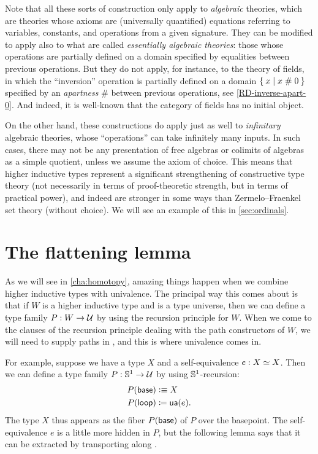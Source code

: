 \mentalpause

Note that all these sorts of construction only apply to \emph{algebraic} theories, which are theories whose axioms are (universally quantified) equations referring to variables, constants, and operations from a given signature.
They can be modified to apply also to what are called \emph{essentially algebraic theories}: those whose operations are partially defined on a domain specified by equalities between previous operations.
But they do not apply, for instance, to the theory of fields, in which the ``inversion'' operation is partially defined on a domain $\Set{x | x \mathrel{\#} 0}$ specified by an \emph{apartness} $\#$ between previous operations, see \autoref{RD-inverse-apart-0}.
And indeed, it is well-known that the category of fields has no initial object.

On the other hand, these constructions do apply just as well to \emph{infinitary} algebraic theories, whose ``operations'' can take infinitely many inputs.
In such cases, there may not be any presentation of free algebras or colimits of algebras as a simple quotient, unless we assume the axiom of choice.
This means that higher inductive types represent a significant strengthening of constructive type theory (not necessarily in terms of proof-theoretic strength, but in terms of practical power), and indeed are stronger in some ways than Zermelo--Fraenkel set theory (without choice).
We will see an example of this in \autoref{sec:ordinals}.


\section{The flattening lemma}
\label{sec:flattening}

As we will see in \autoref{cha:homotopy}, amazing things happen when we combine higher inductive types with univalence.
The principal way this comes about is that if $W$ is a higher inductive type and \UU is a type universe, then we can define a type family $P:W\to \mathcal{U}$ by using the recursion principle for $W$.
When we come to the clauses of the recursion principle dealing with the path constructors of $W$, we will need to supply paths in \UU, and this is where univalence comes in.

For example, suppose we have a type $X$ and a self-equivalence $e:X \simeq X$.
Then we can define a type family $P:\mathbb{S}^1 \to \mathcal{U}$ by using $\mathbb{S}^1$-recursion:
\begin{align*}
  P(\mathsf{base}) &\vcentcolon\equiv X\\
  {P}\mathopen{}\left({\mathsf{loop}}\right)\mathclose{} &\coloneqq \mathsf{ua}(e).
\end{align*}
The type $X$ thus appears as the fiber $P(\mathsf{base})$ of $P$ over the basepoint.
The self-equivalence $e$ is a little more hidden in $P$, but the following lemma says that it can be extracted by transporting along \lloop.

